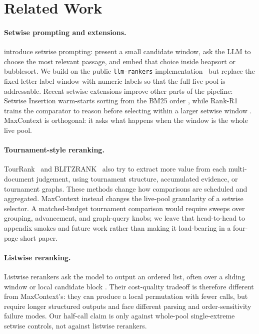 \section{Related Work}
\label{sec:related_work}

\paragraph{Setwise prompting and extensions.}
\citet{zhuang2024setwise} introduce setwise prompting: present a small
candidate window, ask the LLM to choose the most relevant passage, and
embed that choice inside heapsort or bubblesort. We build on the public
\texttt{llm-rankers} implementation~\citep{ielab_llmrankers} but replace
the fixed letter-label window with numeric labels so that the full live
pool is addressable. Recent setwise extensions improve other parts of
the pipeline: Setwise Insertion warm-starts sorting from the BM25 order
\citep{podolak2025setwiseinsertion}, while Rank-R1 trains the comparator
to reason before selecting within a larger setwise window
\citep{zhuang2025rankr1}. MaxContext is orthogonal: it asks what happens
when the window is the whole live pool.

\paragraph{Tournament-style reranking.}
TourRank~\citep{chen2025tourrank} and
BLITZRANK~\citep{blitzrank2026} also try to extract more value from each
multi-document judgement, using tournament structure, accumulated
evidence, or tournament graphs. These methods change how comparisons are
scheduled and aggregated. MaxContext instead changes the live-pool
granularity of a setwise selector. A matched-budget tournament comparison
would require sweeps over grouping, advancement, and graph-query knobs;
we leave that head-to-head to appendix smokes and future work rather than
making it load-bearing in a four-page short paper.

\paragraph{Listwise reranking.}
Listwise rerankers ask the model to output an ordered list, often over a
sliding window or local candidate block
\citep{sun2023rankgpt,ma2023zsl,zhang2025rankwithoutgpt,ren2025selfcalibrated}.
Their cost-quality tradeoff is therefore different from MaxContext's:
they can produce a local permutation with fewer calls, but require longer
structured outputs and face different parsing and order-sensitivity
failure modes. Our half-call claim is only against whole-pool
single-extreme setwise controls, not against listwise rerankers.

